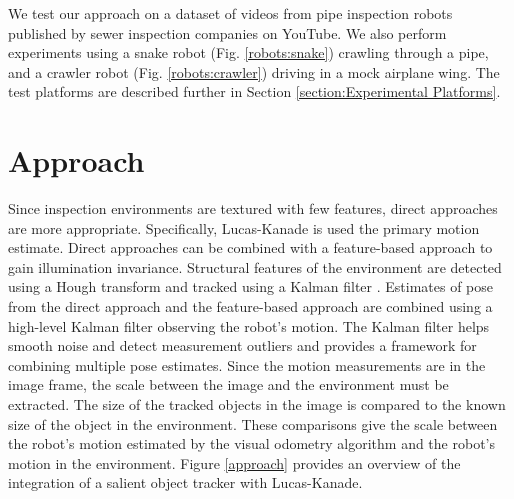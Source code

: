 \documentclass[letterpaper, 10 pt, conference]{ieeeconf}
\begin{document}

We test our approach on a dataset of videos from pipe inspection robots published by sewer inspection companies on YouTube. We also perform experiments using a snake robot (Fig. \ref{robots:snake}) crawling through a pipe, and a crawler robot (Fig. \ref{robots:crawler}) driving in a mock airplane wing. The test platforms are described further in Section \ref{section:Experimental Platforms}.


\section{Approach}



Since inspection environments are textured with few features, direct approaches are more appropriate. Specifically, Lucas-Kanade \cite{Lucas81, lucaskanade} is used the primary motion estimate. Direct approaches can be combined with a feature-based approach to gain illumination invariance. Structural features of the environment are detected using a Hough transform \cite{Hough, GeneralizeHough} and tracked using a Kalman filter \cite{Kalman}. Estimates of pose from the direct approach and the feature-based approach are combined using a high-level Kalman filter observing the robot's motion. The Kalman filter helps smooth noise and detect measurement outliers and provides a framework for combining multiple pose estimates. Since the motion measurements are in the image frame, the scale between the image and the environment must be extracted. The size of the tracked objects in the image is compared to the known size of the object in the environment. These comparisons give the scale between the robot's motion estimated by the visual odometry algorithm and the robot's motion in the environment. Figure \ref{approach} provides an overview of the integration of a salient object tracker with Lucas-Kanade.
\end{document}
